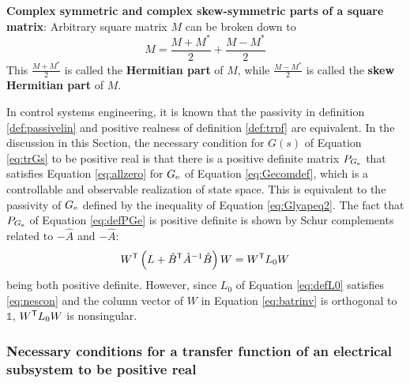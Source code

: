 \documentclass[graybox, envcountchap]{svmult}
\begin{document}
\begin{COLUMN}
\noindent \textbf{Complex symmetric and complex skew-symmetric parts of a square matrix}:
Arbitrary square matrix $M$ can be broken down to
\[
M=\frac{M+M^*}{2}+\frac{M-M^*}{2}
\]
This $\tfrac{M+M^*}{2}$ is called the \textbf{Hermitian part} of $M$, while $\tfrac{M-M^*}{2}$ is called the \textbf{skew Hermitian part} of $M$.
\end{COLUMN}

In control systems engineering, it is known that the passivity in definition \ref{def:passivelin} and positive realness of definition \ref{def:trpf} are equivalent.
In the discussion in this Section, the necessary condition for $G(s)$ of Equation \ref{eq:trGs} to be positive real is that there is a positive definite matrix $P_{G_{\rm e}}$ that satisfies Equation \ref{eq:allzero} for $G_{\rm e}$ of Equation \ref{eq:Gecomdef}, which is a controllable and observable realization of state space.
This is equivalent to the passivity of $G_{\rm e}$ defined by the inequality of Equation \ref{eq:Glyapeq2}.
The fact that $P_{G_{\rm e}}$ of Equation \ref{eq:defPGe} is positive definite is shown by Schur complements related to $-\hat{A}$ and $-\hat{A}$:
\[
W^{\sf T} \left(L+\hat{B}^{\sf T} \hat{A}^{-1} \hat{B} \right) W
=  W^{\sf T} L_0 W
\]
being both positive definite.
However, since $L_0$ of Equation \ref{eq:defL0} satisfies \ref{eq:nescon} and the column vector of $W$ in Equation \ref{eq:batrinv} is orthogonal to $\mathds{1}$, $W^{\sf T} L_0 W$ is nonsingular.




\smallskip
\subsubsection{Necessary conditions for a transfer function of an electrical subsystem to be positive real}
\end{document}

